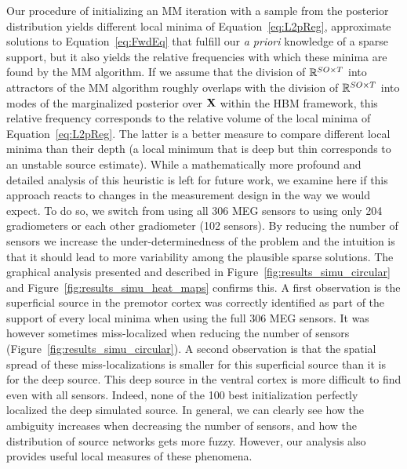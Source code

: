 Our procedure of initializing an MM iteration with a sample from the posterior distribution yields different local minima of Equation~\eqref{eq:L2pReg}, \ie approximate solutions to Equation~\eqref{eq:FwdEq} that fulfill our \emph{a priori} knowledge of a sparse support, but it also yields the relative frequencies with which these minima are found by the MM algorithm. If we assume that the division of $\mathbb{R}^{SO\times T}$ into attractors of the MM algorithm roughly overlaps with the division of $\mathbb{R}^{SO\times T}$ into modes of the marginalized posterior over $\mathbf{X}$ within the HBM framework, this relative frequency corresponds to the relative volume of the local minima of Equation~\eqref{eq:L2pReg}. The latter is a better measure to compare different local minima than their depth (a local minimum that is deep but thin corresponds to an unstable source estimate). While a mathematically more profound and detailed analysis of this heuristic is left for future work, we examine here if this approach reacts to changes in the measurement design in the way we would expect. To do so, we switch from using all 306 MEG sensors to using only 204 gradiometers or each other gradiometer (102 sensors). By reducing the number of sensors we increase the under-determinedness of the problem and the intuition is that it should lead to
more variability among the plausible sparse solutions. The graphical analysis presented and described in Figure~\ref{fig:results_simu_circular} and Figure~\ref{fig:results_simu_heat_maps} confirms this. A first observation is the superficial source in the premotor cortex was correctly identified as part of the support of every local minima when using the full 306 MEG sensors. It was however sometimes miss-localized when reducing the number of sensors (Figure~\ref{fig:results_simu_circular}). A second observation is that the spatial spread of these miss-localizations is smaller for this superficial source than it is for the deep source. This deep source in the ventral cortex is more difficult to find even with all sensors. Indeed, none of the 100 best initialization perfectly localized the deep simulated source. In general, we can clearly see how the ambiguity increases when decreasing the number of sensors, and how the distribution of source networks gets more fuzzy. However, our analysis also provides useful local measures of these phenomena.


